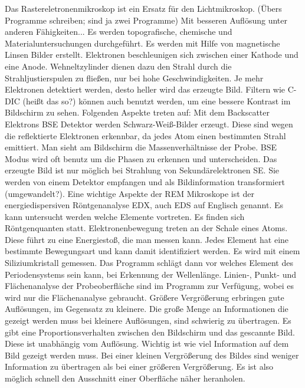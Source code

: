 Das Rastereletronenmikroskop ist ein Ersatz für den Lichtmikroskop. (Übers Programme schreiben; sind ja zwei Programme) Mit besseren Auflösung unter anderen Fähigkeiten... Es werden topografische, chemische und Materialuntersuchungen durchgeführt. Es werden mit Hilfe von magnetische Linsen Bilder erstellt. Elektronen beschleunigen sich zwischen einer Kathode und eine Anode. Wehneltzylinder dienen dazu den Strahl durch die Strahljustierspulen zu fließen, nur bei hohe Geschwindigkeiten. Je mehr Elektronen detektiert werden, desto heller wird das erzeugte Bild. Filtern wie C-DIC (heißt das so?) können auch benutzt werden, um eine bessere Kontrast im Bildschirm zu sehen.
Folgenden Aspekte treten auf:
Mit dem Backscatter Elektrons BSE Detektor werden Schwarz-Weiß-Bilder erzeugt. Diese sind wegen die reflektierte Elektronen erkennbar, da jedes Atom einen bestimmten Strahl emittiert. Man sieht am Bildschirm die Massenverhältnisse der Probe. BSE Modus wird oft benutz um die Phasen zu erkennen und unterscheiden.
Das erzeugte Bild ist nur möglich bei Strahlung von Sekundärelektronen SE. Sie werden von einem Detektor empfangen und als Bildinformation transformiert (umgewandelt?). 
Eine wichtige Aspekte der REM Mikroskope ist der energiedispersiven Röntgenanalyse EDX, auch EDS auf Englisch genannt. Es kann untersucht werden welche Elemente vortreten. Es finden sich Röntgenquanten statt. Elektronenbewegung treten an der Schale eines Atoms. Diese führt zu eine Energiestoß, die man messen kann. Jedes Element hat eine bestimmte Bewegungsart und kann damit identifiziert werden. Es wird mit einem Siliziumkristall gemessen. Das Programm schlägt dann vor welches Element des Periodensystems sein kann, bei Erkennung der Wellenlänge. 
Linien-, Punkt- und Flächenanalyse der Probeoberfläche sind im Programm zur Verfügung, wobei es wird nur die Flächenanalyse gebraucht. 
Größere Vergrößerung erbringen gute Auflösungen, im Gegensatz zu kleinere. Die große Menge an Informationen die gezeigt werden muss bei kleinere Auflösungen, sind schwierig zu übertragen. Es gibt eine Proportionsverhalten zwischen den Bildschirm und das gescannte Bild. Diese ist unabhängig vom Auflösung. Wichtig ist wie viel Information auf dem Bild gezeigt werden muss.  Bei einer kleinen Vergrößerung des Bildes sind weniger Information zu übertragen als bei einer größeren Vergrößerung. Es ist also möglich schnell den Ausschnitt einer Oberfläche näher heranholen.



